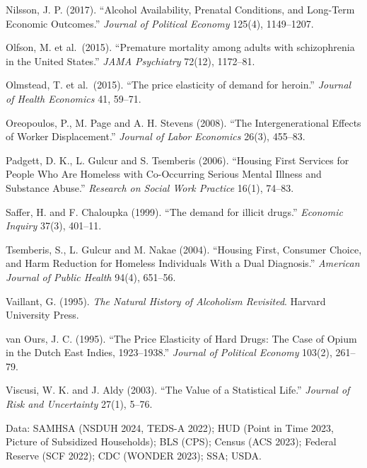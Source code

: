\documentclass[10pt]{article}
\begin{document}
{\begin{list}{}{\setlength{\leftmargin}{1.5em}\setlength{\itemindent}{-1.5em}\setlength{\itemsep}{0.35em}\setlength{\parsep}{0em}}
\item Nilsson, J. P. (2017). ``Alcohol Availability, Prenatal Conditions, and Long-Term Economic Outcomes.'' \emph{Journal of Political Economy} 125(4), 1149--1207.
\item Olfson, M. et al.\ (2015). ``Premature mortality among adults with schizophrenia in the United States.'' \emph{JAMA Psychiatry} 72(12), 1172--81.
\item Olmstead, T. et al.\ (2015). ``The price elasticity of demand for heroin.'' \emph{Journal of Health Economics} 41, 59--71.
\item Oreopoulos, P., M. Page and A. H. Stevens (2008). ``The Intergenerational Effects of Worker Displacement.'' \emph{Journal of Labor Economics} 26(3), 455--83.
\item Padgett, D. K., L. Gulcur and S. Tsemberis (2006). ``Housing First Services for People Who Are Homeless with Co-Occurring Serious Mental Illness and Substance Abuse.'' \emph{Research on Social Work Practice} 16(1), 74--83.
\item Saffer, H. and F. Chaloupka (1999). ``The demand for illicit drugs.'' \emph{Economic Inquiry} 37(3), 401--11.
\item Tsemberis, S., L. Gulcur and M. Nakae (2004). ``Housing First, Consumer Choice, and Harm Reduction for Homeless Individuals With a Dual Diagnosis.'' \emph{American Journal of Public Health} 94(4), 651--56.
\item Vaillant, G. (1995). \emph{The Natural History of Alcoholism Revisited}. Harvard University Press.
\item van Ours, J. C. (1995). ``The Price Elasticity of Hard Drugs: The Case of Opium in the Dutch East Indies, 1923--1938.'' \emph{Journal of Political Economy} 103(2), 261--79.
\item Viscusi, W. K. and J. Aldy (2003). ``The Value of a Statistical Life.'' \emph{Journal of Risk and Uncertainty} 27(1), 5--76.
\end{list}

\noindent Data: SAMHSA (NSDUH 2024, TEDS-A 2022); HUD (Point in Time 2023, Picture of Subsidized Households); BLS (CPS); Census (ACS 2023); Federal Reserve (SCF 2022); CDC (WONDER 2023); SSA; USDA.\par}
\end{document}
